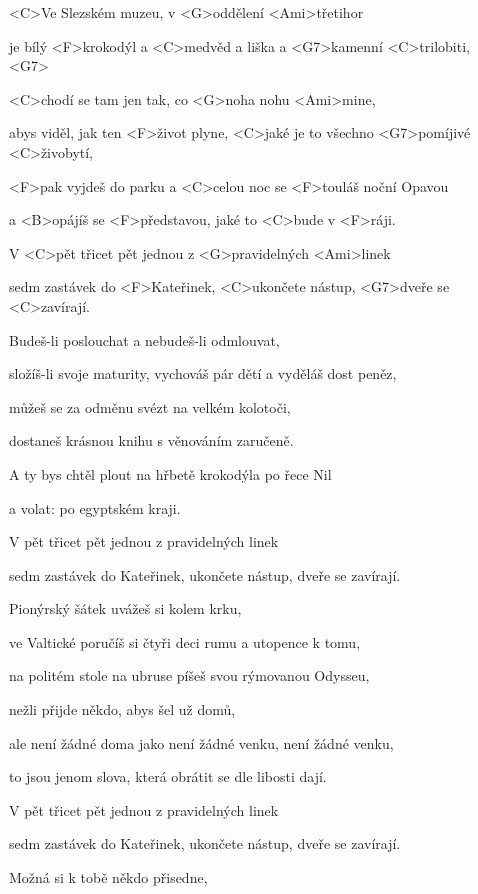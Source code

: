 

\zs
<C>Ve Slezském muzeu, v <G>oddělení <Ami>třetihor

je bílý <F>krokodýl a <C>medvěd a liška a <G7>kamenní <C>trilobiti, <G7>

<C>chodí se tam jen tak, co <G>noha nohu <Ami>mine,

abys viděl, jak ten <F>život plyne, <C>jaké je to všechno <G7>pomíjivé <C>živobytí,

<F>pak vyjdeš do parku a <C>celou noc se <F>touláš noční Opavou

a <B>opájíš se <F>představou, jaké to <C>bude v <F>ráji.

V <C>pět třicet pět jednou z <G>pravidelných <Ami>linek

sedm zastávek do <F>Kateřinek, <C>ukončete nástup, <G7>dveře se <C>zavírají.
\ks

\zs
Budeš-li poslouchat a nebudeš-li odmlouvat,

složíš-li svoje maturity, vychováš pár dětí a vyděláš dost peněz,

můžeš se za odměnu svézt na velkém kolotoči,

dostaneš krásnou knihu s věnováním zaručeně.

A ty bys chtěl plout na hřbetě krokodýla po řece Nil

a volat:  po egyptském kraji.

V pět třicet pět jednou z pravidelných linek

sedm zastávek do Kateřinek, ukončete nástup, dveře se zavírají.
\ks

\zs
Pionýrský šátek uvážeš si kolem krku,

ve Valtické poručíš si čtyři deci rumu a utopence k tomu,

na politém stole na ubruse píšeš svou rýmovanou Odysseu,

nežli přijde někdo, abys šel už domů,

ale není žádné doma jako není žádné venku, není žádné venku,

to jsou jenom slova, která obrátit se dle libosti dají.

V pět třicet pět jednou z pravidelných linek

sedm zastávek do Kateřinek, ukončete nástup, dveře se zavírají.
\ks

\zs
Možná si k tobě někdo přisedne,

